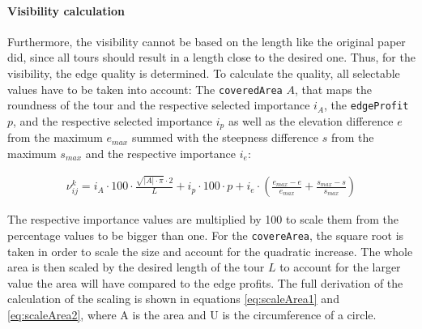 \paragraph{Visibility calculation}

Furthermore, the visibility cannot be based on the length like the original paper did, since all tours should result in a length close to the desired one.
Thus, for the visibility, the edge quality is determined.
To calculate the quality, all selectable values have to be taken into account:
The \texttt{coveredArea} $A$, that maps the roundness of the tour and the respective selected importance $i_A$, the \texttt{edgeProfit} $p$, and the respective selected importance $i_p$ as well as the elevation difference $e$ from the maximum $e_{max}$ summed with the steepness difference $s$ from the maximum $s_{max}$ and the respective importance $i_e$:

\begin{equation}
	\label{eq:newEdgeVisibility}
	\begin{split}
	\nu_{ij}^k = i_A \cdot 100 \cdot \frac{\sqrt{|A|\cdot \pi} \cdot 2 }{L} 
	+  i_p \cdot 100 \cdot p
	+ i_e \cdot \left(\frac{e_{max} - e}{e_{max}} + \frac{s_{max} - s}{s_{max}}\right)
	\end{split}
\end{equation}

The respective importance values are multiplied by 100 to scale them from the percentage values to be bigger than one. 
For the \texttt{covereArea}, the square root is taken in order to scale the size and account for the quadratic increase. 
The whole area is then scaled by the desired length of the tour $L$ to account for the larger value the area will have compared to the edge profits. 
The full derivation of the calculation of the scaling is shown in equations \ref{eq:scaleArea1} and \ref{eq:scaleArea2}, where A is the area and U is the circumference of a circle.


